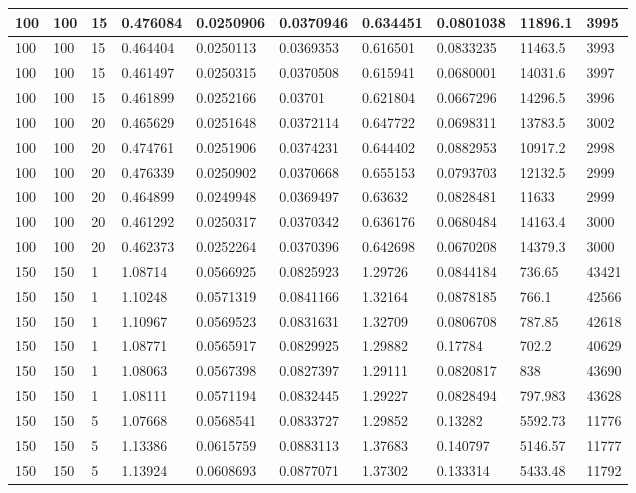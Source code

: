 \begin{landscape}
\begin{longtable}{ | l | l | l | l | l | l | l | l | l | l | }
100 & 100 & 15 & 0.476084 & 0.0250906 & 0.0370946 & 0.634451 & 0.0801038 & 11896.1 & 3995\\ \hline
100 & 100 & 15 & 0.464404 & 0.0250113 & 0.0369353 & 0.616501 & 0.0833235 & 11463.5 & 3993\\ \hline
100 & 100 & 15 & 0.461497 & 0.0250315 & 0.0370508 & 0.615941 & 0.0680001 & 14031.6 & 3997\\ \hline
100 & 100 & 15 & 0.461899 & 0.0252166 & 0.03701 & 0.621804 & 0.0667296 & 14296.5 & 3996\\ \hline
100 & 100 & 20 & 0.465629 & 0.0251648 & 0.0372114 & 0.647722 & 0.0698311 & 13783.5 & 3002\\ \hline
100 & 100 & 20 & 0.474761 & 0.0251906 & 0.0374231 & 0.644402 & 0.0882953 & 10917.2 & 2998\\ \hline
100 & 100 & 20 & 0.476339 & 0.0250902 & 0.0370668 & 0.655153 & 0.0793703 & 12132.5 & 2999\\ \hline
100 & 100 & 20 & 0.464899 & 0.0249948 & 0.0369497 & 0.63632 & 0.0828481 & 11633 & 2999\\ \hline
100 & 100 & 20 & 0.461292 & 0.0250317 & 0.0370342 & 0.636176 & 0.0680484 & 14163.4 & 3000\\ \hline
100 & 100 & 20 & 0.462373 & 0.0252264 & 0.0370396 & 0.642698 & 0.0670208 & 14379.3 & 3000\\ \hline
150 & 150 & 1 & 1.08714 & 0.0566925 & 0.0825923 & 1.29726 & 0.0844184 & 736.65 & 43421\\ \hline
150 & 150 & 1 & 1.10248 & 0.0571319 & 0.0841166 & 1.32164 & 0.0878185 & 766.1 & 42566\\ \hline
150 & 150 & 1 & 1.10967 & 0.0569523 & 0.0831631 & 1.32709 & 0.0806708 & 787.85 & 42618\\ \hline
150 & 150 & 1 & 1.08771 & 0.0565917 & 0.0829925 & 1.29882 & 0.17784 & 702.2 & 40629\\ \hline
150 & 150 & 1 & 1.08063 & 0.0567398 & 0.0827397 & 1.29111 & 0.0820817 & 838 & 43690\\ \hline
150 & 150 & 1 & 1.08111 & 0.0571194 & 0.0832445 & 1.29227 & 0.0828494 & 797.983 & 43628\\ \hline
150 & 150 & 5 & 1.07668 & 0.0568541 & 0.0833727 & 1.29852 & 0.13282 & 5592.73 & 11776\\ \hline
150 & 150 & 5 & 1.13386 & 0.0615759 & 0.0883113 & 1.37683 & 0.140797 & 5146.57 & 11777\\ \hline
150 & 150 & 5 & 1.13924 & 0.0608693 & 0.0877071 & 1.37302 & 0.133314 & 5433.48 & 11792\\ \hline

\end{longtable}
\end{landscape}
